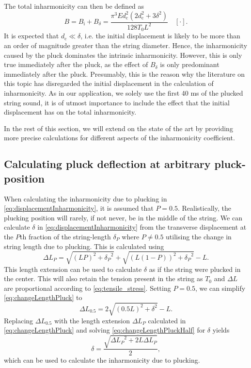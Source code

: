 \documentclass{article}
\begin{document}
\begin{sloppy}
The total inharmonicity can then be defined as
\begin{equation}\label{eq:totalInharmonicity}
    B =  B_\text{i} + B_\delta =  \frac{\pi^3 E d_\text{c}^2(2d_\text{c}^2 + 3\delta^2)}{128 T_0 L^2}\quad [\cdot].
\end{equation}
It is expected that $d_\text{c}\ll\delta$, i.e. the initial displacement is likely to be more than an order of magnitude greater than the string diameter. Hence, the inharmonicity caused by the pluck dominates the intrinsic inharmonicity. However, this is only true immediately after the pluck, as the effect of $B_\delta$ is only predominant immediately after the pluck. Presumably, this is the reason why the literature on this topic has disregarded the initial displacement in the calculation of inharmonicity. As in our application, we solely use the first 40 ms of the plucked string sound, it is of utmost importance to include the effect that the initial displacement has on the total inharmonicity.

In the rest of this section, we will extend on the state of the art by providing more precise calculations for different aspects of the inharmonicity coefficient.

\subsection{Calculating pluck deflection at arbitrary pluck-position}
When calculating the inharmonicity due to plucking in \eqref{eq:displacementInharmonicity}, it is assumed that $P = 0.5$. Realistically, the plucking position will rarely, if not never, be in the middle of the string. We can calculate $\delta$ in \eqref{eq:displacementInharmonicity} from the transverse displacement at the $P$th fraction of the string-length $\delta_P$ where $P \neq 0.5$ utilising the change in string length due to plucking. This is calculated using
\begin{equation}\label{eq:changeLengthPluck}
    \Delta L_P = \sqrt{(LP)^2+{\delta_P}^2}+\sqrt{(L(1-P))^2+{\delta_P}^2} - L.
\end{equation}
This length extension can be used to calculate $\delta$ as if the string were plucked in the center. This will also retain the tension present in the string as $T_0$ and $\Delta L$ are proportional according to \eqref{eq:tensile_stress}. Setting $P = 0.5$, we can simplify \eqref{eq:changeLengthPluck} to
%
\begin{equation}\label{eq:changeLengthPluckHalf}
    \Delta L_{0.5} = 2\sqrt{(0.5L)^2 + \delta^2} - L.
\end{equation}
%
Replacing $\Delta L_{0.5}$ with the length extension $\Delta L_P$ calculated in \eqref{eq:changeLengthPluck} and solving \eqref{eq:changeLengthPluckHalf} for $\delta$ yields
\begin{equation}
    \delta = \frac{\sqrt{{\Delta L_P}^2+2L\Delta L_P}}{2},
\end{equation}
which can be used to calculate the inharmonicity due to plucking.

\end{sloppy}
\end{document}
